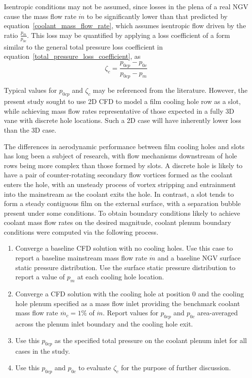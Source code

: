 \documentclass[a4paper, 11pt, oneside]{report}
\begin{document}
Isentropic conditions may not be assumed, since losses in the plena of a real NGV cause the mass flow rate $\dot{m}$ to be significantly lower than that predicted by equation~\ref{coolant_mass_flow_rate}, which assumes isentropic flow driven by the ratio $\frac{p_m}{p_{0c}}$. This loss may be quantified by applying a loss coefficient of a form similar to the general total pressure loss coefficient in equation~\ref{total_pressure_loss_coefficient}, as
\begin{equation}\label{film_coolant_loss_coefficient}
\zeta_c = 
\frac{
p_{0cp} - p_{0c}
}{
p_{0cp} - p_m
}
\end{equation}

Typical values for $p_{0cp}$ and $\zeta_c$ may be referenced from the literature. However, the present study sought to use 2D CFD to model a film cooling hole row as a slot, while achieving mass flow rates representative of those expected in a fully 3D vane with discrete hole locations. Such a 2D case will have inherently lower loss than the 3D case. 

The differences in aerodynamic performance between film cooling holes and slots has long been a subject of research, with flow mechanisms downstream of hole rows being more complex than those formed by slots. A discrete hole is likely to have a pair of counter-rotating secondary flow vortices formed as the coolant enters the hole, with an unsteady process of vortex stripping and entrainment into the mainstream as the coolant exits the hole. In contrast, a slot tends to form a steady contiguous film on the external surface, with a separation bubble present under some conditions. To obtain boundary conditions likely to achieve coolant mass flow rates on the desired magnitude, coolant plenum boundary conditions were computed via the following process.
\begin{enumerate}
  \item Converge a baseline CFD solution with no cooling holes. Use this case to report a baseline mainstream mass flow rate $\dot{m}$ and a baseline NGV surface static pressure distribution. Use the surface static pressure distribution to report a value of $p_m$ at each cooling hole location.
  \item Converge a CFD solution with the cooling hole at position $0$ and the cooling hole plenum specified as a mass flow inlet providing the benchmark coolant mass flow rate $\dot{m_c} = 1\%$ of $\dot{m}$. Report values for $p_{0cp}$ and $p_{0c}$ area-averaged across the plenum inlet boundary and the cooling hole exit.
  \item Use  this $p_{0cp}$ as the specified total pressure on the coolant plenum inlet for all cases in the study.
  \item Use this $p_{0cp}$ and $p_{0c}$ to evaluate $\zeta_c$ for the purpose of further discussion.
\end{enumerate}
\end{document}
